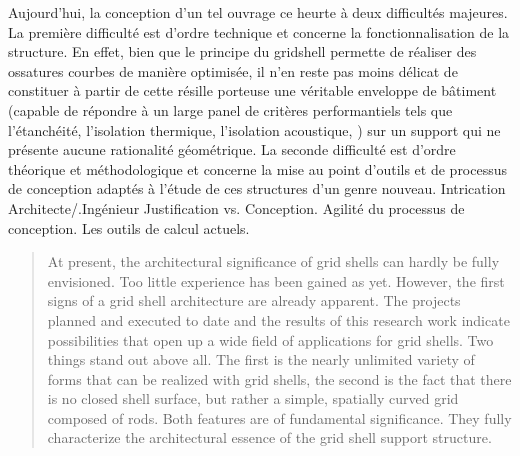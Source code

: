 Aujourd'hui, la conception d'un tel ouvrage ce heurte à deux difficultés majeures. 
La première difficulté est d'ordre technique et concerne la fonctionnalisation de la structure. En effet, bien que le principe du gridshell permette de réaliser des ossatures courbes de manière optimisée, il n'en reste pas moins délicat de constituer à partir de cette résille porteuse une véritable enveloppe de bâtiment (capable de répondre à un large panel de critères performantiels tels que l'étanchéité, l'isolation thermique, l'isolation acoustique, \telp{}) sur un support qui ne présente aucune rationalité géométrique. 
La seconde difficulté est d'ordre théorique et méthodologique et concerne la mise au point d'outils et de processus de conception adaptés à l'étude de ces structures d'un genre nouveau. Intrication Architecte/.Ingénieur Justification vs. Conception. Agilité du processus de conception. Les outils de calcul actuels.


\blockcquote[Frei Otto][p.~250]{IL10}{At present, the architectural significance of grid shells can hardly be fully envisioned. Too little experience has been gained as yet. However, the first signs of a grid shell architecture are already apparent. The projects planned and executed to date and the results of this research work indicate possibilities that open up a wide field of applications for grid shells. Two things stand out above all. The first is the nearly unlimited variety of forms that can be realized with grid shells, the second is the fact that there is no closed shell surface, but rather a simple, spatially curved grid composed of rods. Both features are of fundamental significance. They fully characterize the architectural essence of the grid shell support structure.}




